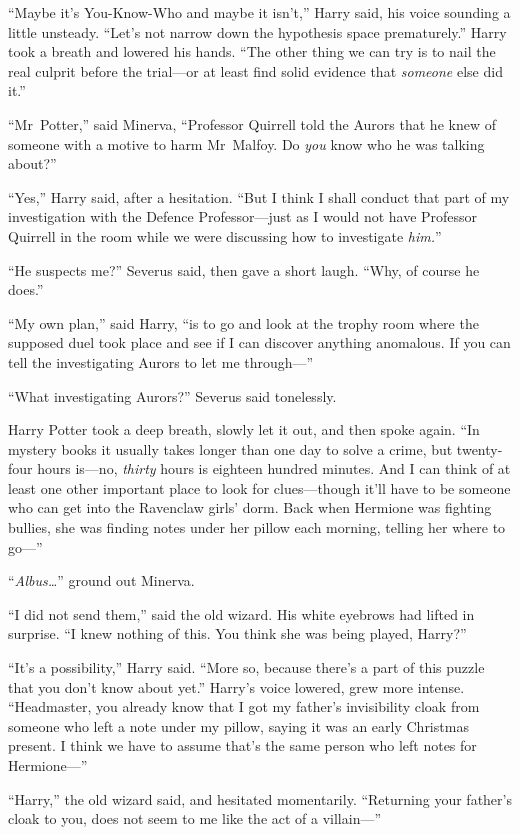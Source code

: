 “Maybe it’s You-Know-Who and maybe it isn’t,” Harry said, his voice sounding a little unsteady. “Let’s not narrow down the hypothesis space prematurely.” Harry took a breath and lowered his hands. “The other thing we can try is to nail the real culprit before the trial—or at least find solid evidence that \emph{someone} else did it.”

“Mr~Potter,” said Minerva, “Professor Quirrell told the Aurors that he knew of someone with a motive to harm Mr~Malfoy. Do \emph{you} know who he was talking about?”

“Yes,” Harry said, after a hesitation. “But I think I shall conduct that part of my investigation with the Defence Professor—just as I would not have Professor Quirrell in the room while we were discussing how to investigate \emph{him.}”

“He suspects me?” Severus said, then gave a short laugh. “Why, of course he does.”

“My own plan,” said Harry, “is to go and look at the trophy room where the supposed duel took place and see if I can discover anything anomalous. If you can tell the investigating Aurors to let me through—”

“What investigating Aurors?” Severus said tonelessly.

Harry Potter took a deep breath, slowly let it out, and then spoke again. “In mystery books it usually takes longer than one day to solve a crime, but twenty-four hours is—no, \emph{thirty} hours is eighteen hundred minutes. And I can think of at least one other important place to look for clues—though it’ll have to be someone who can get into the Ravenclaw girls’ dorm. Back when Hermione was fighting bullies, she was finding notes under her pillow each morning, telling her where to go—”

“\emph{Albus…}” ground out Minerva.

“I did not send them,” said the old wizard. His white eyebrows had lifted in surprise. “I knew nothing of this. You think she was being played, Harry?”

“It’s a possibility,” Harry said. “More so, because there’s a part of this puzzle that you don’t know about yet.” Harry’s voice lowered, grew more intense. “Headmaster, you already know that I got my father’s invisibility cloak from someone who left a note under my pillow, saying it was an early Christmas present. I think we have to assume that’s the same person who left notes for Hermione—”

“Harry,” the old wizard said, and hesitated momentarily. “Returning your father’s cloak to you, does not seem to me like the act of a villain—”

